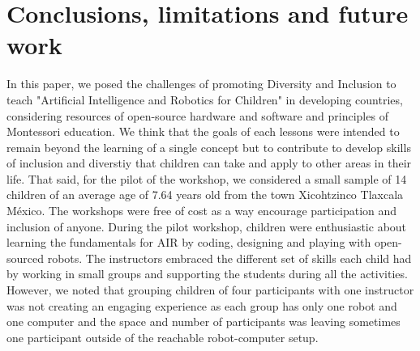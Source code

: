 \documentclass[conference]{IEEEtran}
\begin{document}
    

\section{Conclusions, limitations and future work}
In this paper, we posed the challenges of promoting Diversity and Inclusion to teach "Artificial Intelligence and Robotics for Children" in developing countries, considering resources of open-source hardware and software and principles of Montessori education. 
We think that the goals of each lessons were intended to remain beyond the learning of a single concept but to contribute to develop skills of inclusion and diverstiy that children can take and apply to other areas in their life.
That said, for the pilot of the workshop, we considered a small sample of 14 children of an average age of 7.64 years old from the town Xicohtzinco Tlaxcala M\'exico. 
The workshops were free of cost as a way encourage participation and inclusion of anyone. 
During the pilot workshop, children were enthusiastic about learning the fundamentals for AIR by coding, designing and playing with open-sourced robots. 
The instructors embraced the different set of skills each child had by working in small groups and supporting the students during all the activities. 
However, we noted that grouping children of four participants with one instructor was not creating an engaging experience as each group has only one robot and one computer and the space and number of participants was leaving sometimes one participant outside of the reachable robot-computer setup.
\end{document}
